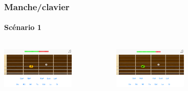 \documentclass{beamer}
\begin{document}
	\begin{frame}

   		\frametitle{Manche/clavier}

       		\framesubtitle{Scénario 1}

		\begin{columns}

			 \begin{column}{0.33\textwidth}

				\includegraphics[width=3.5cm]{images/clavier_question.png}

			\end{column}

			 \begin{column}{0.33\textwidth}

				\includegraphics[width=3.5cm]{images/clavier_bonne.png}

				
			\end{column}

			 \begin{column}{0.33\textwidth}

				
			\end{column}

		\end{columns} 

	\end{frame}
\end{document}
